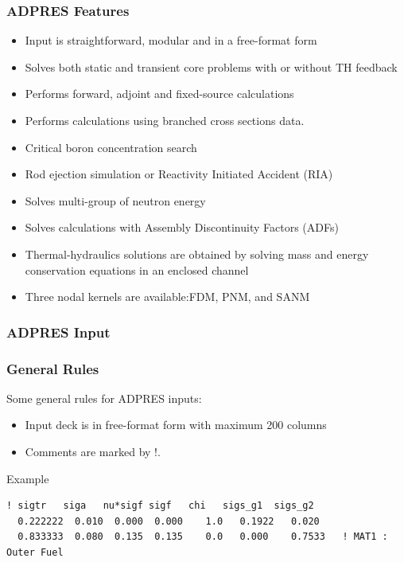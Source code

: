 \documentclass{beamer}
\begin{document}
\begin{frame}
\frametitle{ADPRES Features}
\begin{itemize}
  \item Input is straightforward, modular and in a free-format form
  \item Solves both static and transient core problems with or without TH feedback
  \item Performs forward, adjoint and fixed-source calculations
  \item Performs calculations using branched cross sections data.
  \item Critical boron concentration search
  \item Rod ejection simulation or Reactivity Initiated Accident (RIA)
  \item Solves multi-group of neutron energy
  \item Solves calculations with Assembly Discontinuity Factors (ADFs)
  \item Thermal-hydraulics solutions are obtained by solving mass and energy conservation equations in an enclosed channel
  \item Three nodal kernels are available:FDM, PNM, and SANM
\end{itemize}
\end{frame}

\begin{frame}[fragile]
\frametitle{ADPRES Input}
\frametitle{General Rules}
Some general rules for ADPRES inputs:
\begin{itemize}
  \item Input deck is in free-format form with maximum 200 columns
  \item Comments are marked by !.
\end{itemize}
\begin{block}{Example}
\begin{Verbatim}[fontsize=\scriptsize]
  ! sigtr   siga   nu*sigf sigf   chi   sigs_g1  sigs_g2
  0.222222  0.010  0.000  0.000    1.0   0.1922   0.020
  0.833333  0.080  0.135  0.135    0.0   0.000    0.7533   ! MAT1 : Outer Fuel
\end{Verbatim}
\end{block}
\end{frame}

\end{document}
